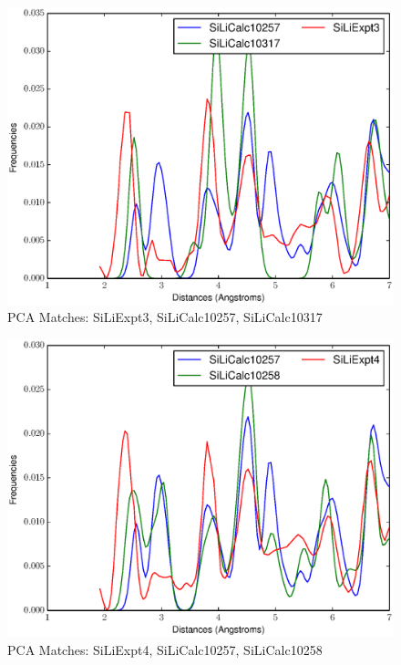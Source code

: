 \documentclass[12pt,letterpaper]{article}
\begin{document}
\begin{figure}[ht]
  \begin{center}
    \includegraphics[scale=0.8]{figs/PC10MatchSiLiExpt3-SiLiCalc10257-SiLiCalc10317.eps}
    \caption{PCA Matches: SiLiExpt3, SiLiCalc10257, SiLiCalc10317}
  \end{center}
\end{figure}

\begin{figure}[ht]
  \begin{center}
    \includegraphics[scale=0.8]{figs/PC10MatchSiLiExpt4-SiLiCalc10257-SiLiCalc10258.eps}
    \caption{PCA Matches: SiLiExpt4, SiLiCalc10257, SiLiCalc10258}
  \end{center}
\end{figure}
\end{document}
